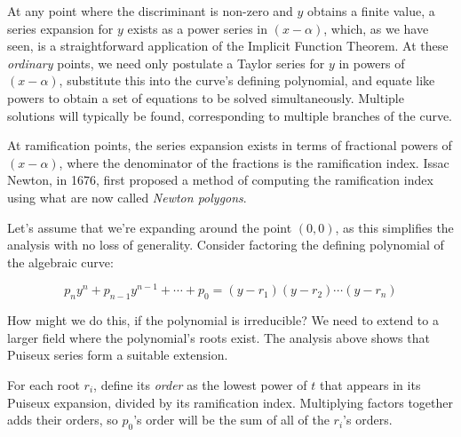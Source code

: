 
At any point where the discriminant is non-zero and $y$ obtains a
finite value, a series expansion for $y$ exists as a power series in
$(x-\alpha)$, which, as we have seen, is a straightforward application
of the Implicit Function Theorem.  At these {\it ordinary} points, we
need only postulate a Taylor series for $y$ in powers of $(x-\alpha)$,
substitute this into the curve's defining polynomial, and equate like
powers to obtain a set of equations to be solved simultaneously.
Multiple solutions will typically be found, corresponding to multiple
branches of the curve.


At ramification points, the series expansion exists in terms
of fractional powers of $(x-\alpha)$, where the denominator
of the fractions is the ramification index.  Issac Newton,
in 1676, first proposed a method of computing the ramification index
using what are now called {\it Newton polygons}.



Let's assume that we're expanding around the point $(0,0)$, as this
simplifies the analysis with no loss of generality.  Consider
factoring the defining polynomial of the algebraic curve:

$$p_n y^n + p_{n-1}y^{n-1} + \cdots + p_0 = (y-r_1)(y-r_2)\cdots(y-r_n)$$

How might we do this, if the polynomial is irreducible?  We need to
extend to a larger field where the polynomial's roots exist.  The
analysis above shows that Puiseux series form a suitable extension.

For each root $r_i$, define its {\it order} as the lowest power of $t$
that appears in its Puiseux expansion, divided by its ramification
index.  Multiplying factors together adds their orders, so
$p_0$'s order will be the sum of all of the $r_i$'s orders.




